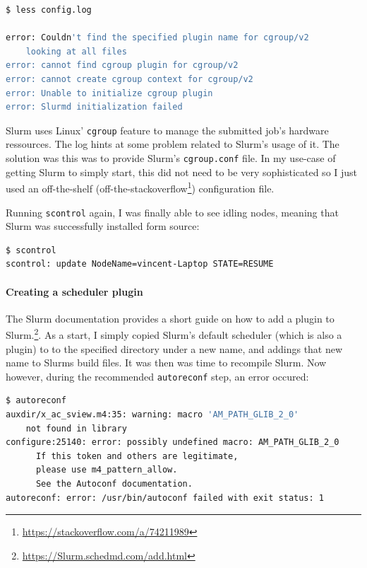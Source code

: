 \begin{lstlisting}[language=bash, frame=single, numbers=none, caption={Slurm error logs}, basicstyle=\ttfamily]
$ less config.log

error: Couldn't find the specified plugin name for cgroup/v2
    looking at all files
error: cannot find cgroup plugin for cgroup/v2
error: cannot create cgroup context for cgroup/v2
error: Unable to initialize cgroup plugin
error: Slurmd initialization failed

\end{lstlisting}

Slurm uses Linux' \verb|cgroup| feature to manage the submitted job's hardware ressources. The log hints at some problem related to Slurm's usage of it.
The solution was this was to provide Slurm's \verb|cgroup.conf| file. In my use-case of getting Slurm to simply start, this did not need to be very sophisticated so I just used an off-the-shelf (off-the-stackoverflow\footnote{\url{https://stackoverflow.com/a/74211989}}) configuration file.

Running \verb|scontrol| again, I was finally able to see idling nodes, meaning that Slurm was successfully installed form source:

\begin{lstlisting}[language=bash, frame=single, numbers=none, caption={Slurm running}, basicstyle=\ttfamily]
$ scontrol
scontrol: update NodeName=vincent-Laptop STATE=RESUME
\end{lstlisting}

\paragraph{Creating a scheduler plugin}

The Slurm documentation provides a short guide on how to add a plugin to Slurm.\footnote{\url{https://Slurm.schedmd.com/add.html}}. 
As a start, I simply copied Slurm's default scheduler (which is also a plugin) to to the specified directory under a new name, and addings that new name to Slurms build files. 
It was then was time to recompile Slurm. 
Now however, during the recommended \verb|autoreconf| step, an error occured:

\begin{lstlisting}[language=bash, frame=single, numbers=none, caption={Plugin recompilation errors}, basicstyle=\ttfamily]
$ autoreconf
auxdir/x_ac_sview.m4:35: warning: macro 'AM_PATH_GLIB_2_0' 
    not found in library
configure:25140: error: possibly undefined macro: AM_PATH_GLIB_2_0
      If this token and others are legitimate, 
      please use m4_pattern_allow.
      See the Autoconf documentation.
autoreconf: error: /usr/bin/autoconf failed with exit status: 1
\end{lstlisting}

